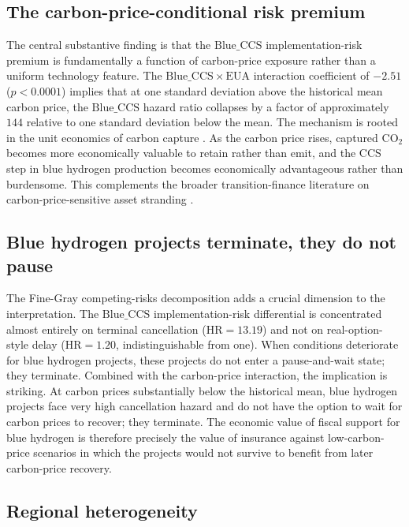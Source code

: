 \documentclass[11pt,a4paper]{article}
\newcommand{\HR}{\mathrm{HR}}
\newcommand{\BlueCCS}{\mathrm{Blue\_CCS}}
\newcommand{\EUA}{\mathrm{EUA}}
\begin{document}
\subsection{The carbon-price-conditional risk premium}

The central substantive finding is that the $\BlueCCS$ implementation-risk premium is fundamentally a function of carbon-price exposure rather than a uniform technology feature. The $\BlueCCS \times \EUA$ interaction coefficient of $-2.51$ ($p < 0.0001$) implies that at one standard deviation above the historical mean carbon price, the $\BlueCCS$ hazard ratio collapses by a factor of approximately $144$ relative to one standard deviation below the mean. The mechanism is rooted in the unit economics of carbon capture \citep{Bui2018, Budinis2018}. As the carbon price rises, captured $\mathrm{CO}_2$ becomes more economically valuable to retain rather than emit, and the CCS step in blue hydrogen production becomes economically advantageous rather than burdensome. This complements the broader transition-finance literature on carbon-price-sensitive asset stranding \citep{Mercure2018, Caldecott2018, BoltonKacperczyk2021}.

\subsection{Blue hydrogen projects terminate, they do not pause}

The Fine-Gray competing-risks decomposition adds a crucial dimension to the interpretation. The $\BlueCCS$ implementation-risk differential is concentrated almost entirely on terminal cancellation ($\HR = 13.19$) and not on real-option-style delay ($\HR = 1.20$, indistinguishable from one). When conditions deteriorate for blue hydrogen projects, these projects do not enter a pause-and-wait state; they terminate. Combined with the carbon-price interaction, the implication is striking. At carbon prices substantially below the historical mean, blue hydrogen projects face very high cancellation hazard and do not have the option to wait for carbon prices to recover; they terminate. The economic value of fiscal support for blue hydrogen is therefore precisely the value of insurance against low-carbon-price scenarios in which the projects would not survive to benefit from later carbon-price recovery.

\subsection{Regional heterogeneity}
\end{document}
